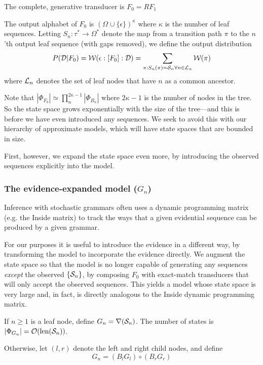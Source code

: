 \documentclass{article}
\newcommand{\seclabel}[1]{\label{sec.#1}}
\newcommand\gappedalphabet[1]{(\Omega_{#1} \cup \{\epsilon\})}
\newcommand\wtrans[4]{#1(#2 : [#3] : #4)}
\newcommand\compose{}
\newcommand\fork{\circ}
\newcommand\recognize{\nabla}
\newcommand\States{\Phi}
\newcommand\statesof[1]{\States_{#1}}
\newcommand\Transitions{\tau}
\newcommand\weight{{\cal W}}
\newcommand\numberofstates[1]{|\statesof{#1}|}
\newcommand\numberofleaves{\kappa}
\newcommand\numberofnodes{2\numberofleaves - 1}
\newcommand\leaves{{\cal L}}
\newcommand\seqlen[1]{\mbox{len}(#1)}
\newcommand\outputs{{\cal D}}
\newcommand\outputn[1]{{\cal S}_{#1}}
\newcommand\outseqlen[1]{\seqlen{\outputn{#1}}}
\newcommand\order[1]{{\cal O}(#1)}
\begin{document}
The complete, generative transducer is
$F_0 = R \compose F_1$

The output alphabet of $F_0$ is $\gappedalphabet{}^\numberofleaves$ where $\numberofleaves$ is the number of leaf sequences.
Letting $S_n:\Transitions^\ast \to \Omega^\ast$ denote the map from a transition path $\pi$ to the $n$'th output leaf sequence (with gaps removed),
we define the output distribution
\[
P(\outputs|F_0) = \wtrans{\weight}{\epsilon}{F_0}{\outputs} = \sum_{\pi: S_n(\pi)=\outputn{n} \forall n \in \leaves_n} \weight(\pi)
\]
where $\leaves_n$ denotes the set of leaf nodes that have $n$ as a common ancestor.

Note that $\numberofstates{F_0} \simeq \prod_n^{\numberofnodes} \numberofstates{B_n}$ where $\numberofnodes$ is the number of nodes in the tree.
So the state space grows exponentially with the size of the tree---and this is before we have even introduced any sequences.
We seek to avoid this with our hierarchy of approximate models, which will have state spaces that are bounded in size.

First, however, we expand the state space even more, by introducing the observed sequences explicitly into the model.

\subsubsection{The evidence-expanded model ($G_n$)}
\seclabel{EvidenceExpandedModel}

Inference with stochastic grammars often uses a dynamic programming matrix (e.g. the Inside matrix)
to track the ways that a given evidential sequence can be produced by a given grammar.

For our purposes it is useful to introduce the evidence in a different way,
by transforming the model to incorporate the evidence directly.
We augment the state space so that the model is no longer capable of generating any sequences {\em except} the observed $\{\outputn{n}\}$,
by composing $F_0$ with exact-match transducers that will only accept the observed sequences.
This yields a model whose state space is very large and, in fact, is directly analogous to the Inside dynamic programming matrix.

If $n \geq 1$ is a leaf node, define $G_n = \recognize(\outputn{n})$.
The number of states is $\numberofstates{G_n} = \order{\outseqlen{n}}$.

Otherwise, let $(l,r)$ denote the left and right child nodes, and define
\[
G_n = (B_l \compose G_l) \fork (B_r \compose G_r)
\]
\end{document}
